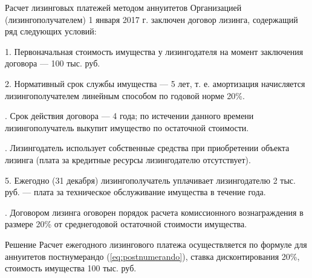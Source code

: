 \documentclass[_Banking_p3.tex]{subfiles}
\begin{document}
\begin{frame}[ allowframebreaks] {Расчет лизинговых платежей методом аннуитетов}
Организацией (лизингополучателем) 1 января 2017 г. заключен договор лизинга, содержащий ряд следующих условий:

1.	Первоначальная стоимость имущества у лизингодателя на момент заключения договора — 100 тыс. руб.

2.	Нормативный срок службы имущества — 5 лет, т. е. амортизация начисляется лизингополучателем линейным способом по годовой норме 20\%.

.	Срок действия договора — 4 года; по истечении данного времени лизингополучатель выкупит имущество по остаточной стоимости.

.	Лизингодатель использует собственные средства при приобретении объекта лизинга (плата за кредитные ресурсы лизингодателю отсутствует).

5.	Ежегодно (31 декабря) лизингополучатель уплачивает лизингодателю 2 тыс. руб. — плата за техническое обслуживание имущества в течение года.

.	Договором лизинга оговорен порядок расчета комиссионного вознаграждения в размере 20\% от среднегодовой остаточной стоимости имущества.

\end{frame}

\begin{frame}{Решение}
Расчет ежегодного лизингового платежа осуществляется по формуле для аннуитетов постнумерандо (\ref{eq:postnumerando}), ставка дисконтирования 20\%, стоимость имущества 100 тыс. руб.
\end{frame}
\end{document}
